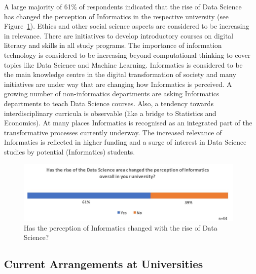 A large majority of 61\% of respondents indicated that the rise of Data Science has changed the perception of Informatics in the respective university (see Figure~\ref{sect4:}). Ethics and other social science aspects are considered to be increasing in relevance. There are initiatives to develop introductory courses on digital literacy and skills in all study programs. The importance of information technology is considered to be increasing beyond computational thinking to cover topics like Data Science and Machine Learning. Informatics is considered to be the main knowledge centre in the digital transformation of society and many initiatives are under way that are changing how Informatics is perceived. A growing number of non-informatics departments are asking Informatics departments to teach Data Science courses. Also, a tendency towards interdisciplinary curricula is observable (like a bridge to Statistics and Economics). At many places Informatics is recognised as an integrated part of the transformative processes currently underway. The increased relevance of Informatics is reflected in higher funding and a surge of interest in Data Science studies by potential (Informatics) students.

\begin{figure}[h]
\centering
\includegraphics[width = \linewidth]{charts/4b.jpg}
\caption{Has the perception of Informatics changed with the rise of Data Science?}
\label{sect4:}
\end{figure}

\subsection{Current Arrangements at Universities}


